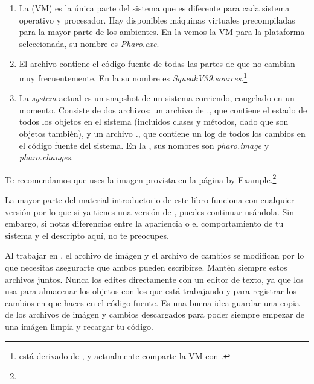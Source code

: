 \documentclass[a4paper,10pt,twoside]{book}
\begin{document}
\begin{enumerate}

  \item La  (VM) es la \'unica parte del sistema que es diferente para cada sistema operativo y procesador. Hay disponibles m\'aquinas virtuales precompiladas para la mayor parte de los ambientes. En la  vemos la VM para la plataforma seleccionada, su nombre es \textit{Pharo.exe}.

  \item El archivo  contiene el c\'odigo fuente de todas las partes de \pharo que no cambian muy frecuentemente. En la  su nombre es \emph{SqueakV39.sources}.\footnote{\pharo est\'a derivado de , y actualmente comparte la VM con \squeak.}

  \item La \emph{system } actual es un snapshot de un sistema \pharo corriendo, congelado en un momento. Consiste de dos archivos: un archivo de \emph{.}, que contiene el estado de todos los objetos en el sistema (incluidos clases y m\'etodos, dado que son objetos tambi\'en), y un archivo \emph{.}, que contiene un log de todos los cambios en el c\'odigo fuente del sistema.
En la , sus nombres son \emph{pharo.image} y \emph{pharo.changes}.
\end{enumerate}

Te recomendamos que uses la imagen provista en la p\'agina \pharo by Example.\footnote{\pbe}

La mayor parte del material introductorio de este libro funciona con cualquier versi\'on por lo que si ya tienes una versi\'on de \pharo, puedes continuar us\'andola.
Sin embargo, si notas diferencias entre la apariencia o el comportamiento de tu sistema y el descripto aqu\'i, no te preocupes. 

Al trabajar en \pharo, el archivo de im\'agen y el archivo de cambios se modifican por lo que necesitas asegurarte que ambos pueden escribirse.
Mant\'en siempre estos archivos juntos.
Nunca los edites directamente con un editor de texto, ya que \pharo los usa para almacenar los objetos con los que est\'a trabajando y para registrar los cambios en que haces en el c\'odigo fuente.
Es una buena idea guardar una copia de los archivos de im\'agen y cambios descargados para poder siempre empezar de una im\'agen limpia y recargar tu c\'odigo.
\end{document}
